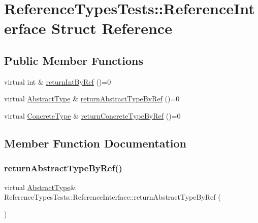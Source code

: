 \hypertarget{structReferenceTypesTests_1_1ReferenceInterface}{}\section{Reference\+Types\+Tests\+::Reference\+Interface Struct Reference}
\label{structReferenceTypesTests_1_1ReferenceInterface}
\subsection*{Public Member Functions}
\begin{DoxyCompactItemize}
\item 
virtual int \& \mbox{\hyperlink{structReferenceTypesTests_1_1ReferenceInterface_afd8d8c8298ec7506b041140ad0024842}{return\+Int\+By\+Ref}} ()=0
\item 
virtual \mbox{\hyperlink{classReferenceTypesTests_1_1AbstractType}{Abstract\+Type}} \& \mbox{\hyperlink{structReferenceTypesTests_1_1ReferenceInterface_a7440b6f23d81d75ff2b62f75cc9b22e7}{return\+Abstract\+Type\+By\+Ref}} ()=0
\item 
virtual \mbox{\hyperlink{classReferenceTypesTests_1_1ConcreteType}{Concrete\+Type}} \& \mbox{\hyperlink{structReferenceTypesTests_1_1ReferenceInterface_a1c65afa6dbf5d542df6f8160b8d2a311}{return\+Concrete\+Type\+By\+Ref}} ()=0
\end{DoxyCompactItemize}


\subsection{Member Function Documentation}
\mbox{\label{structReferenceTypesTests_1_1ReferenceInterface_a7440b6f23d81d75ff2b62f75cc9b22e7}} 
\subsubsection{\texorpdfstring{returnAbstractTypeByRef()}{returnAbstractTypeByRef()}}
{\footnotesize\ttfamily virtual \mbox{\hyperlink{classReferenceTypesTests_1_1AbstractType}{Abstract\+Type}}\& Reference\+Types\+Tests\+::\+Reference\+Interface\+::return\+Abstract\+Type\+By\+Ref (\begin{DoxyParamCaption}{ }\end{DoxyParamCaption})\hspace{0.3cm}{\ttfamily [pure virtual]}}

